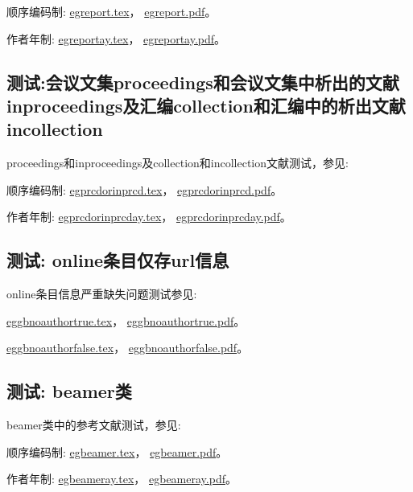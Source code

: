 顺序编码制:
\href{run:./example/egreport.tex}{egreport.tex}，
\href{run:./example/egreport.pdf}{egreport.pdf}。

作者年制:
\href{run:./example/egreportay.tex}{egreportay.tex}，
\href{run:./example/egreportay.pdf}{egreportay.pdf}。


\subsection{测试:会议文集proceedings和会议文集中析出的文献inproceedings及汇编collection和汇编中的析出文献incollection}

proceedings和inproceedings及collection和incollection文献测试，参见:

顺序编码制:
\href{run:./example/egprcdorinprcd.tex}{egprcdorinprcd.tex}，
\href{run:./example/egprcdorinprcd.pdf}{egprcdorinprcd.pdf}。

作者年制:
\href{run:./example/egprcdorinprcday.tex}{egprcdorinprcday.tex}，
\href{run:./example/egprcdorinprcday.pdf}{egprcdorinprcday.pdf}。






\subsection{测试: online条目仅存url信息}
\label{sec:opt:noauthor}
online条目信息严重缺失问题测试参见:

\href{run:./example/eggbnoauthortrue.tex}{eggbnoauthortrue.tex}，
\href{run:./example/eggbnoauthortrue.pdf}{eggbnoauthortrue.pdf}。

\href{run:./example/eggbnoauthorfalse.tex}{eggbnoauthorfalse.tex}，
\href{run:./example/eggbnoauthorfalse.pdf}{eggbnoauthorfalse.pdf}。


\subsection{测试: beamer类}

beamer类中的参考文献测试，参见:

顺序编码制:
\href{run:./example/egbeamer.tex}{egbeamer.tex}，
\href{run:./example/egbeamer.pdf}{egbeamer.pdf}。

作者年制:
\href{run:./example/egbeameray.tex}{egbeameray.tex}，
\href{run:./example/egbeameray.pdf}{egbeameray.pdf}。

